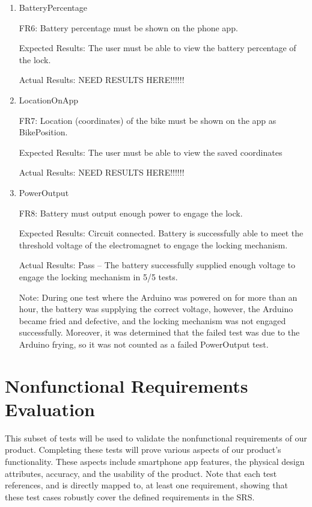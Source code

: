 \documentclass[12pt, titlepage]{article}
\begin{document}
\begin{enumerate}

\item{BatteryPercentage

FR6: Battery percentage must be shown on the phone app. }

Expected Results: The user must be able to view the battery percentage of the lock.

Actual Results: NEED RESULTS HERE!!!!!!

\item{LocationOnApp

FR7: Location (coordinates) of the bike must be shown on the app as BikePosition.}

Expected Results: The user must be able to view the saved coordinates 

Actual Results: NEED RESULTS HERE!!!!!!

\item{PowerOutput

FR8: Battery must output enough power to engage the lock. }

Expected Results: Circuit connected. Battery is successfully able to meet the threshold voltage of the electromagnet to engage the locking mechanism.  

Actual Results: Pass -- The battery successfully supplied enough voltage to engage the locking mechanism in 5/5 tests. 

Note: During one test where the Arduino was powered on for more than an hour, the battery was supplying the correct voltage, however, the Arduino became fried and defective, and the locking mechanism was not engaged successfully. Moreover, it was determined that the failed test was due to the Arduino frying, so it was not counted as a failed PowerOutput test.

\end{enumerate}

\section{Nonfunctional Requirements Evaluation}

This subset of tests will be used to validate the nonfunctional requirements of our product. Completing these tests will prove various aspects of our product's functionality. These aspects include smartphone app features, the physical design attributes, accuracy, and the usability of the product. Note that each test references, and is directly mapped to, at least one requirement, showing that these test cases robustly cover the defined requirements in the SRS.
\end{document}
